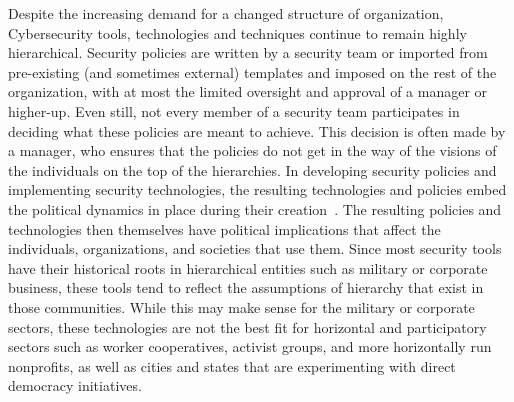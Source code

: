 
Despite the increasing demand for a changed structure of organization, 
Cybersecurity tools, technologies and techniques continue to remain highly 
hierarchical. Security policies are written by a security team or imported from
pre-existing (and sometimes external) templates and imposed on the rest of the
organization, with at most the limited oversight and approval of a manager or
higher-up. Even still, not every member of a security team participates
in deciding what these policies are meant to achieve. This decision is often
made by a manager, who ensures that the policies do not get in the way of the
visions of the individuals on the top of the hierarchies. In developing
security policies and implementing security technologies, the resulting
technologies and policies embed the political dynamics in place during their
creation~\cite{winner1980artifacts}. The resulting policies and technologies
then themselves have political implications that affect the individuals,
organizations, and societies that use them. Since most security tools have their
historical roots in hierarchical entities such as military or corporate business, these
tools tend to reflect the assumptions of hierarchy that exist in those
communities. While this may make sense for the military or corporate sectors,
these technologies are not the best fit for horizontal and participatory sectors
such as worker cooperatives, activist groups, and more horizontally run nonprofits, as
well as cities and states that are experimenting with direct democracy initiatives.

